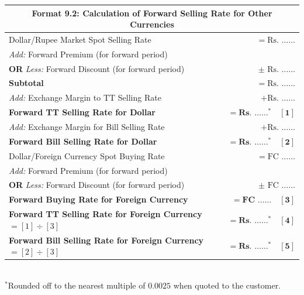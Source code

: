 \vspace{0.8em}

\begin{center}
\small
\begin{tabularx}{0.96\linewidth}{Xr}
    \toprule
    \multicolumn{2}{c}{\textbf{Format 9.2: Calculation of Forward Selling Rate for Other Currencies}} \\
    \midrule
    Dollar/Rupee Market Spot Selling Rate & $= \text{Rs. } \dots\dots$ \\
    \textit{Add:} Forward Premium (for forward period) & \\
    \quad\textbf{OR} \textit{Less:} Forward Discount (for forward period) & $\pm\text{ Rs. } \dots\dots$ \\
    \midrule
    \textbf{Subtotal} & $= \text{Rs. } \dots\dots$ \\
    \textit{Add:} Exchange Margin to TT Selling Rate & $+ \text{Rs. } \dots\dots$ \\
    \midrule
    \textbf{Forward TT Selling Rate for Dollar} & $\mathbf{= \text{Rs. } \dots\dots^\ast \quad [1]}$ \\
    \textit{Add:} Exchange Margin for Bill Selling Rate & $+ \text{Rs. } \dots\dots$ \\
    \midrule
    \textbf{Forward Bill Selling Rate for Dollar} & $\mathbf{= \text{Rs. } \dots\dots^\ast \quad [2]}$ \\
    \midrule
    Dollar/Foreign Currency Spot Buying Rate & $= \text{FC } \dots\dots$ \\
    \textit{Add:} Forward Premium (for forward period) & \\
    \quad\textbf{OR} \textit{Less:} Forward Discount (for forward period) & $\pm\text{ FC } \dots\dots$ \\
    \midrule
    \textbf{Forward Buying Rate for Foreign Currency} & $\mathbf{= \text{FC } \dots\dots \quad [3]}$ \\
    \midrule
    \textbf{Forward TT Selling Rate for Foreign Currency} $= [1] \div [3]$ & $\mathbf{= \text{Rs. } \dots\dots^\ast \quad [4]}$ \\
    \textbf{Forward Bill Selling Rate for Foreign Currency} $= [2] \div [3]$ & $\mathbf{= \text{Rs. } \dots\dots^\ast \quad [5]}$ \\
    \bottomrule
\end{tabularx}\\[0.3em]
{\footnotesize $^\ast$Rounded off to the nearest multiple of $0.0025$ when quoted to the customer.}
\end{center}

